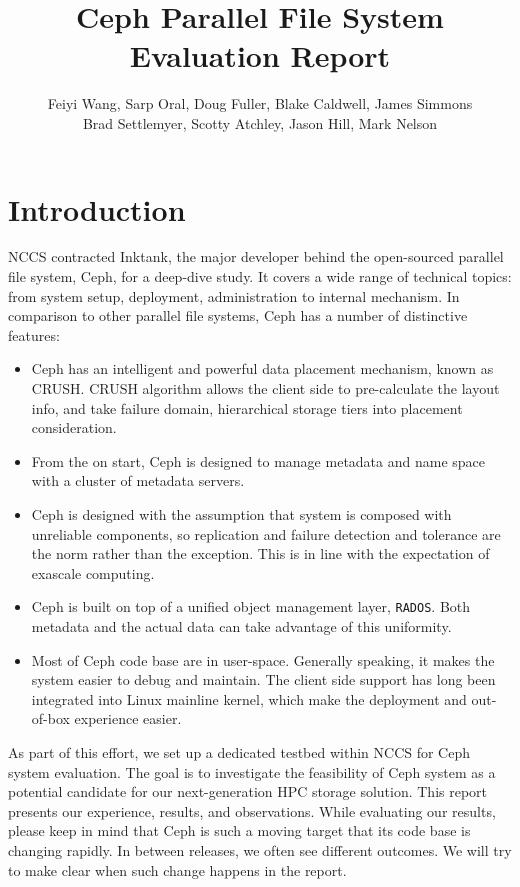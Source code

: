 \documentclass{article}
\title{Ceph Parallel File System Evaluation Report}
\author{Feiyi Wang, Sarp Oral, Doug Fuller, Blake Caldwell, James Simmons\\
Brad Settlemyer, Scotty Atchley, Jason Hill, Mark Nelson}
\begin{document}



\section{Introduction}

NCCS contracted Inktank, the major developer behind the open-sourced parallel
file system, Ceph, for a deep-dive study. It covers a wide range of technical
topics: from system setup, deployment, administration to internal mechanism. In
comparison to other parallel file systems, Ceph has a number of distinctive
features:

\begin{itemize}
  \item Ceph has an intelligent and powerful data placement mechanism, known as
  CRUSH. CRUSH algorithm allows the client side to pre-calculate the layout
  info, and take failure domain, hierarchical storage tiers into placement
  consideration.
  
  \item From the on start, Ceph is designed to manage metadata and name space
  with a cluster of metadata servers.

\item Ceph is designed with the assumption that system is composed with
unreliable components, so replication and failure detection and tolerance are
the norm rather than the exception. This is in line with the expectation of
exascale computing.

\item Ceph is built on top of a unified object management layer,
\texttt{RADOS}. Both metadata and the actual data can take advantage of this
uniformity.

\item Most of Ceph code base are in user-space. Generally speaking, it makes the
system easier to debug and maintain. The client side support has long been
integrated into Linux mainline kernel, which make the deployment and out-of-box
experience easier.

\end{itemize}


As part of this effort, we set up a dedicated testbed within NCCS for Ceph
system evaluation. The goal is to investigate the feasibility of Ceph system as
a potential candidate for our next-generation HPC storage solution.
This report presents our experience, results, and observations. While evaluating
our results, please keep in mind that Ceph is such a moving target that its
code base is changing rapidly. In between releases, we often see different
outcomes. We will try to make clear when such change happens in the report.
\end{document}
